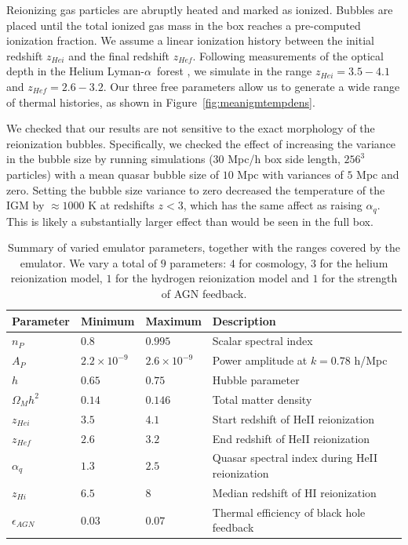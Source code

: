 \documentclass[a4paper,11pt]{article}
\newcommand{\Lya}{Lyman-$\alpha$}
\begin{document}
Reionizing gas particles are abruptly heated and marked as ionized. Bubbles are placed until the total ionized gas mass in the box reaches
a pre-computed ionization fraction. We assume a linear ionization history between the initial redshift $z_{Hei}$ and the final redshift $z_{Hef}$. Following measurements of the optical depth in the Helium \Lya~forest \cite{Worseck:2019}, we simulate in the range $z_{Hei} = 3.5 -  4.1$ and $z_{Hef} = 2.6 - 3.2$. Our three free parameters allow us to generate a wide range of thermal histories, as shown in Figure~\ref{fig:meanigmtempdens}.

We checked that our results are not sensitive to the exact morphology of the reionization bubbles.
Specifically, we checked the effect of increasing the variance in the bubble size by running simulations ($30$ Mpc/h box side length, $256^3$ particles) with a mean quasar bubble size of $10$ Mpc with variances of $5$ Mpc and zero.
Setting the bubble size variance to zero decreased the temperature of the IGM by $\approx 1000$ K at redshifts $z<3$, which has the same affect as raising $\alpha_q$. This is likely a substantially larger effect than would be seen in the full box.

\begin{table}
\begin{centering}
  \begin{tabular}{llll}
  \hline
  Parameter & Minimum & Maximum & Description \\
    \hline
    $n_P$  &  $0.8$  & $0.995$ & Scalar spectral index \\
    $A_P$  &  $2.2 \times 10^{-9}$  & $2.6 \times 10^{-9}$ & Power amplitude at $k = 0.78$ h/Mpc \\
    $h$    & $0.65$  & $0.75$ & Hubble parameter \\
    $\Omega_M h^2$ & $0.14$ & $0.146$ & Total matter density \\
    $z_{Hei}$      & $3.5$  & $4.1$  & Start redshift of HeII reionization \\
    $z_{Hef}$      & $2.6$  & $3.2$  & End redshift of HeII reionization \\
    $\alpha_q$     & $1.3$  & $2.5$ & Quasar spectral index during HeII reionization  \\
    $z_{Hi}$        & $6.5$ & $8$   & Median redshift of HI reionization \\
    $\epsilon_{AGN}$ & $0.03$ & $0.07$ & Thermal efficiency of black hole feedback \\
    \hline
  \end{tabular}
  \caption{Summary of varied emulator parameters, together with the ranges covered by the emulator. We vary a total of $9$ parameters: $4$ for cosmology, $3$ for the helium reionization model, $1$ for the hydrogen reionization model and $1$ for the strength of AGN feedback. }
  \label{tab:emulatorparams}
  \end{centering}
\end{table}
\end{document}
